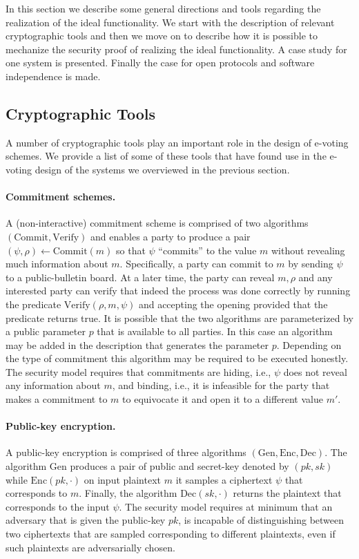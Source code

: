 In this section we describe some general directions and tools
regarding the realization of the ideal functionality. We start with
the description of relevant cryptographic tools and then we move on to
describe how it is possible to mechanize the security proof of
realizing the ideal functionality.  A case study for one system is
presented. Finally the case for open protocols and software
independence is made.

\subsection{Cryptographic Tools}

A number of cryptographic tools play an important role in the design
of e-voting schemes. We provide a list of some of these tools that
have found use in the e-voting design of the systems we overviewed in
the previous section.

\paragraph{Commitment schemes.} A (non-interactive) commitment scheme
is comprised of two algorithms $(\mathrm{Commit}, \mathrm{Verify})$
and enables a party to produce a pair
$(\psi, \rho) \leftarrow \mathrm{Commit}(m)$ so that $\psi$
``commits'' to the value $m$ without revealing much information about
$m$. Specifically, a party can commit to $m$ by sending $\psi$ to a
public-bulletin board. At a later time, the party can reveal $m,\rho$
and any interested party can verify that indeed the process was done
correctly by running the predicate $\mathrm{Verify}(\rho, m, \psi)$
and accepting the opening provided that the predicate returns true.
It is possible that the two algorithms are parameterized by a public
parameter $p$ that is available to all parties. In this case an
algorithm may be added in the description that generates the parameter
$p$. Depending on the type of commitment this algorithm may be
required to be executed honestly. The security model requires that
commitments are hiding, i.e., $\psi$ does not reveal any information
about $m$, and binding, i.e., it is infeasible for the party that
makes a commitment to $m$ to equivocate it and open it to a different
value $m'$.

\paragraph{Public-key encryption.} A public-key encryption is
comprised of three algorithms
$(\mathrm{Gen},\mathrm{Enc}, \mathrm{Dec})$.  The algorithm
$\mathrm{Gen}$ produces a pair of public and secret-key denoted by
$(pk,sk)$ while $\mathrm{Enc}(pk, \cdot )$ on input plaintext $m$ it
samples a ciphertext $\psi$ that corresponds to $m$. Finally, the
algorithm $\mathrm{Dec}(sk, \cdot )$ returns the plaintext that
corresponds to the input $\psi$. The security model requires at
minimum that an adversary that is given the public-key $pk$, is
incapable of distinguishing between two ciphertexts that are sampled
corresponding to different plaintexts, even if such plaintexts are
adversarially chosen.


